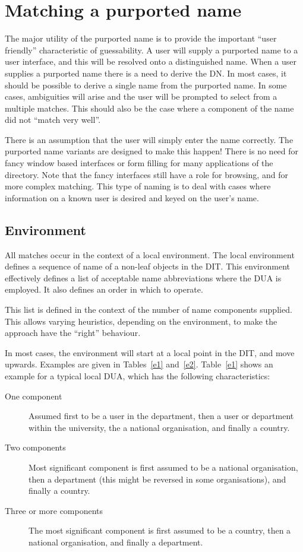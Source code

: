 \section {Matching a purported name}

The major utility of the purported name is to provide the important ``user
friendly'' characteristic of guessability.  A user will supply a purported
name to a user interface, and this will be resolved onto a distinguished
name.   
When a user supplies a purported name there is a need to derive the DN.  In
most cases, it should be possible to derive a single name from the purported
name.  In some cases, ambiguities will arise and the user will be prompted
to select from a multiple matches.  This should also be the case where a
component of the name did not ``match very well''.   

There is an assumption that the user will simply enter the name correctly.
The purported name variants are designed to make this happen!  There is no
need for fancy window based interfaces or form filling for many applications
of the directory.  Note that the fancy interfaces still have a role for
browsing, and for more complex matching.  This type of naming is to deal
with cases where information on a known user is desired and keyed on the
user's name.

\subsection {Environment}




All matches occur in the context of a local environment.
The local environment defines a 
sequence of name of a non-leaf objects in the DIT.   
This environment effectively defines a list of acceptable name abbreviations
where the DUA is employed.   It also defines an order in which to operate.


This list is defined in the context of the number of name components
supplied.  This allows varying heuristics, depending on the environment, to
make the approach have the ``right'' behaviour.


In most cases, the environment will start at a local point in the DIT, and
move upwards.   Examples are given in Tables~\ref{e1} and~\ref{e2}.
Table~\ref{e1} shows an example for a typical local DUA, which has the
following characteristics:

\begin{description}
\item[One component] Assumed first to be a user in the department, then a
user or department within the university, the a national organisation, and
finally a country.
\item[Two components] Most significant component is first assumed to be a
national organisation, then a department (this might be reversed in some
organisations), and finally a country.
\item[Three or more components] The most significant component is first
assumed to be a country, then a national organisation, and finally a
department. 
\end{description}



